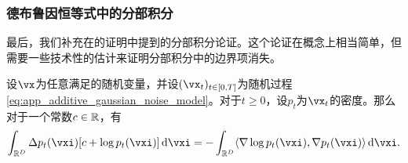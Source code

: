 \documentclass[../../book-main.tex]{subfiles}
\begin{document}
\subsubsection{德布鲁因恒等式中的分部积分}

最后，我们补充在的证明中提到的分部积分论证。这个论证在概念上相当简单，但需要一些技术性的估计来证明分部积分中的边界项消失。

\begin{lemma}\label{lem:diffusion_ibp}
    设\(\vx\)为任意满足的随机变量，并设\((\vx_{t})_{t \in [0, T]}\)为随机过程\eqref{eq:app_additive_gaussian_noise_model}。对于\(t \geq 0\)，设\(p_{t}\)为\(\vx_{t}\)的密度。那么对于一个常数\(c \in \mathbb{R}\)，有
    \begin{equation}
        \int_{\R^{D}}\Delta p_{t}(\vxi)[c + \log p_{t}(\vxi)]\odif{\vxi} = -\int_{\R^{D}}\ip{\nabla \log p_{t}(\vxi)}{\nabla p_{t}(\vxi)}\odif{\vxi}.
    \end{equation}
\end{lemma}
\end{document}
